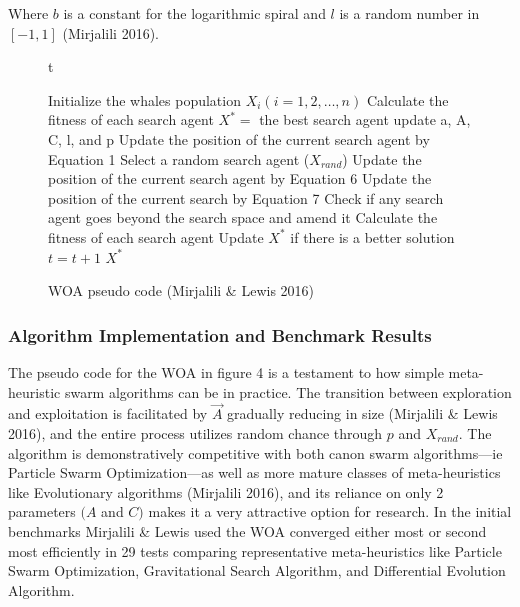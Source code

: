 \documentclass[11pt]{article}
\begin{document}
Where $b$ is a constant for the logarithmic spiral and $l$ is a random number in $[-1, 1]$ (Mirjalili 2016).

\begin{figure}{t}
	\caption{WOA pseudo code (Mirjalili \& Lewis 2016)}
	\begin{algorithm}[H]
		\scriptsize
		\begin{algorithmic}[1]
			\STATE Initialize the whales population $X_i(i = 1,2, \dots, n)$
			\STATE Calculate the fitness of each search agent
			\STATE $X^* = $ the best search agent
					\STATE update a, A, C, l, and p
							\STATE Update the position of the current search agent by Equation 1
						\ELSE
							\STATE Select a random search agent ($X_{rand}$)
							\STATE Update the position of the current search agent by Equation 6
						\ENDIF
					\ELSE
						\STATE Update the position of the current search by Equation 7
					\ENDIF
				\ENDFOR
				\STATE Check if any search agent goes beyond the search space and amend it
				\STATE Calculate the fitness of each search agent
				\STATE Update $X^*$ if there is a better solution
				\STATE $t = t+1$
			\ENDWHILE
			\STATE \RETURN $X^*$ 
		\end{algorithmic}
	\end{algorithm}
\end{figure}

\subsubsection*{Algorithm Implementation and Benchmark Results}
The pseudo code for the WOA in figure 4 is a testament to how simple meta-heuristic swarm algorithms can be in practice.
The transition between exploration and exploitation is facilitated by $\vec{A}$ gradually reducing in size (Mirjalili \& Lewis 2016), and the entire process utilizes random chance through $p$ and $X_{rand}$.
The algorithm is demonstratively competitive with both canon swarm algorithms---ie Particle Swarm Optimization---as well as more mature classes of meta-heuristics like Evolutionary algorithms (Mirjalili 2016), and its reliance on only 2 parameters $(A$ and $C)$ makes it a very attractive option for research.
In the initial benchmarks Mirjalili \& Lewis used the WOA converged either most or second most efficiently in 29 tests comparing representative meta-heuristics like Particle Swarm Optimization, Gravitational Search Algorithm, and Differential Evolution Algorithm.
\end{document}
